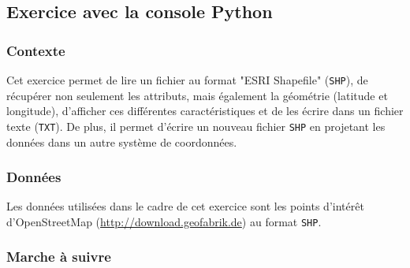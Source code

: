 \documentclass[11pt]{article}
\begin{document}
\subsection{Exercice avec la console Python}
\label{Exercice}

\subsubsection{Contexte}
Cet exercice permet de lire un fichier au format "ESRI Shapefile" (\texttt{SHP}), de récupérer non seulement les attributs, mais également la géométrie (latitude et longitude), d'afficher ces différentes caractéristiques et de les écrire dans un fichier texte (\texttt{TXT}). De plus, il permet d'écrire un nouveau fichier \texttt{SHP} en projetant les données dans un autre système de coordonnées. 

\subsubsection{Données}
Les données utilisées dans le cadre de cet exercice sont les points d'intérêt d'OpenStreetMap (\url{http://download.geofabrik.de}) au format \texttt{SHP}. 

\subsubsection{Marche à suivre}
\end{document}
